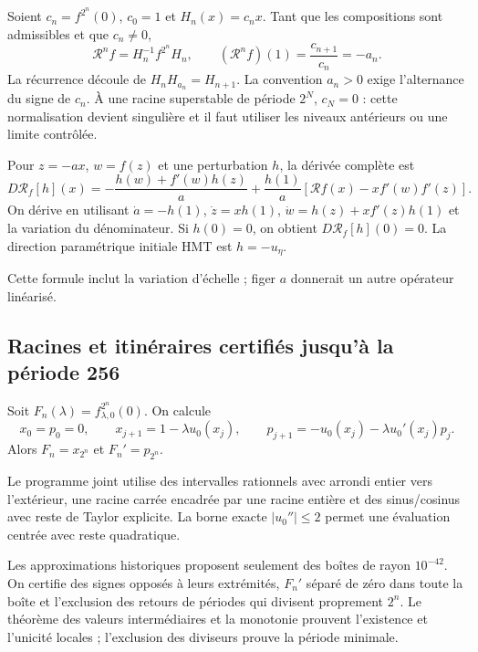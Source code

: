 Soient \(c_n=f^{2^n}(0)\), \(c_0=1\) et \(H_n(x)=c_nx\). Tant que les compositions sont admissibles et que \(c_n\ne0\),
\[
\boxed{\mathcal R^nf=H_n^{-1}f^{2^n}H_n},\qquad
(\mathcal R^nf)(1)=\frac{c_{n+1}}{c_n}=-a_n.
\]
La récurrence découle de \(H_nH_{a_n}=H_{n+1}\). La convention \(a_n>0\) exige l’alternance du signe de \(c_n\). À une racine superstable de période \(2^N\), \(c_N=0\) : cette normalisation devient singulière et il faut utiliser les niveaux antérieurs ou une limite contrôlée.

Pour \(z=-ax\), \(w=f(z)\) et une perturbation \(h\), la dérivée complète est
\[
\boxed{
D\mathcal R_f[h](x)=
-\frac{h(w)+f'(w)h(z)}a+
\frac{h(1)}a
\left[\mathcal Rf(x)-xf'(w)f'(z)\right].
}
\]
On dérive en utilisant \(\dot a=-h(1)\), \(\dot z=xh(1)\),
\(\dot w=h(z)+xf'(z)h(1)\) et la variation du dénominateur. Si \(h(0)=0\), on obtient \(D\mathcal R_f[h](0)=0\). La direction paramétrique initiale HMT est \(h=-u_\eta\).

Cette formule inclut la variation d’échelle ; figer \(a\) donnerait un autre opérateur linéarisé.


\subsection{Racines et itinéraires certifiés jusqu’à la période 256}
\label{hmtfg:desarrollo:7}

Soit \(F_n(\lambda)=f_{\lambda,0}^{2^n}(0)\). On calcule
\[
x_0=p_0=0,\qquad x_{j+1}=1-\lambda u_0(x_j),\qquad
p_{j+1}=-u_0(x_j)-\lambda u_0'(x_j)p_j.
\]
Alors \(F_n=x_{2^n}\) et \(F_n'=p_{2^n}\).

Le programme joint utilise des intervalles rationnels avec arrondi entier vers l’extérieur, une racine carrée encadrée par une racine entière et des sinus/cosinus avec reste de Taylor explicite. La borne exacte \(|u_0''|\le2\) permet une évaluation centrée avec reste quadratique.

Les approximations historiques proposent seulement des boîtes de rayon \(10^{-42}\). On certifie des signes opposés à leurs extrémités, \(F_n'\) séparé de zéro dans toute la boîte et l’exclusion des retours de périodes qui divisent proprement \(2^n\). Le théorème des valeurs intermédiaires et la monotonie prouvent l’existence et l’unicité locales ; l’exclusion des diviseurs prouve la période minimale.

